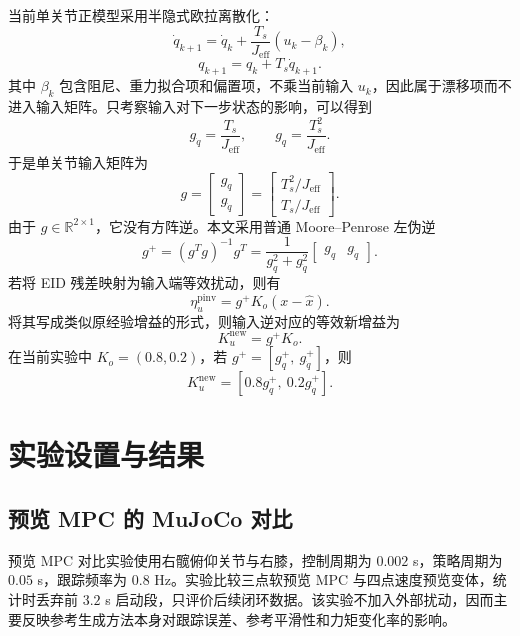 \documentclass[12pt,a4paper]{ctexart}
\begin{document}
当前单关节正模型采用半隐式欧拉离散化：
\[
    \dot q_{k+1}=\dot q_k+\frac{T_s}{J_\mathrm{eff}}(u_k-\beta_k),
\]
\[
    q_{k+1}=q_k+T_s\dot q_{k+1}.
\]
其中 \(\beta_k\) 包含阻尼、重力拟合项和偏置项，不乘当前输入 \(u_k\)，因此属于漂移项而不进入输入矩阵。只考察输入对下一步状态的影响，可以得到
\[
    g_{\dot q}=\frac{T_s}{J_\mathrm{eff}},\qquad
    g_q=\frac{T_s^2}{J_\mathrm{eff}}.
\]
于是单关节输入矩阵为
\[
    g=
    \begin{bmatrix}
    g_q\\
    g_{\dot q}
    \end{bmatrix}
    =
    \begin{bmatrix}
    T_s^2/J_\mathrm{eff}\\
    T_s/J_\mathrm{eff}
    \end{bmatrix}.
\]
由于 \(g\in\mathbb{R}^{2\times1}\)，它没有方阵逆。本文采用普通 Moore--Penrose 左伪逆
\[
    g^+=(g^Tg)^{-1}g^T
    =
    \frac{1}{g_q^2+g_{\dot q}^2}
    \begin{bmatrix}
    g_q & g_{\dot q}
    \end{bmatrix}.
\]
若将 EID 残差映射为输入端等效扰动，则有
\[
    \eta_u^{\mathrm{pinv}}=g^+K_o(x-\hat x).
\]
将其写成类似原经验增益的形式，则输入逆对应的等效新增益为
\[
    K_u^{\mathrm{new}}=g^+K_o.
\]
在当前实验中 \(K_o=(0.8,0.2)\)，若 \(g^+=[g_q^+,\ g_{\dot q}^+]\)，则
\[
    K_u^{\mathrm{new}}=[0.8g_q^+,\ 0.2g_{\dot q}^+].
\]

\section{实验设置与结果}

\subsection{预览 MPC 的 MuJoCo 对比}

预览 MPC 对比实验使用右髋俯仰关节与右膝，控制周期为 \(0.002\) s，策略周期为 \(0.05\) s，跟踪频率为 \(0.8\) Hz。实验比较三点软预览 MPC 与四点速度预览变体，统计时丢弃前 \(3.2\) s 启动段，只评价后续闭环数据。该实验不加入外部扰动，因而主要反映参考生成方法本身对跟踪误差、参考平滑性和力矩变化率的影响。
\end{document}
